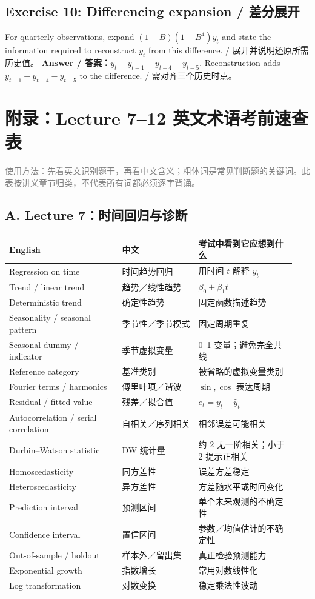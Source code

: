 \documentclass[UTF8,fontset=fandol,10.5pt,a4paper]{ctexart}
\begin{document}
\subsection*{Exercise 10: Differencing expansion / 差分展开}
For quarterly observations, expand $(1-B)(1-B^4)y_t$ and state the information required to reconstruct $y_t$ from this difference. / 展开并说明还原所需历史值。
\textbf{Answer / 答案：}$y_t-y_{t-1}-y_{t-4}+y_{t-5}$. Reconstruction adds $y_{t-1}+y_{t-4}-y_{t-5}$ to the difference. / 需对齐三个历史时点。
\clearpage
\section*{附录：Lecture 7--12 英文术语考前速查表}
\textcolor{graytext}{\small 使用方法：先看英文识别题干，再看中文含义；粗体词是常见判断题的关键词。此表按讲义章节归类，不代表所有词都必须逐字背诵。}

\subsection*{A. Lecture 7：时间回归与诊断}
\begin{longtable}{@{}p{0.37\linewidth}p{0.25\linewidth}p{0.32\linewidth}@{}}
\toprule English & 中文 & 考试中看到它应想到什么\\\midrule\endhead
Regression on time & 时间趋势回归 & 用时间 $t$ 解释 $y_t$\\
Trend / linear trend & 趋势／线性趋势 & $\beta_0+\beta_1t$\\
Deterministic trend & 确定性趋势 & 固定函数描述趋势\\
Seasonality / seasonal pattern & 季节性／季节模式 & 固定周期重复\\
Seasonal dummy / indicator & 季节虚拟变量 & 0--1 变量；避免完全共线\\
Reference category & 基准类别 & 被省略的虚拟变量类别\\
Fourier terms / harmonics & 傅里叶项／谐波 & $\sin,\cos$ 表达周期\\
Residual / fitted value & 残差／拟合值 & $e_t=y_t-\hat y_t$\\
Autocorrelation / serial correlation & 自相关／序列相关 & 相邻误差可能相关\\
Durbin--Watson statistic & DW 统计量 & 约 2 无一阶相关；小于 2 提示正相关\\
Homoscedasticity & 同方差性 & 误差方差稳定\\
Heteroscedasticity & 异方差性 & 方差随水平或时间变化\\
Prediction interval & 预测区间 & 单个未来观测的不确定性\\
Confidence interval & 置信区间 & 参数／均值估计的不确定性\\
Out-of-sample / holdout & 样本外／留出集 & 真正检验预测能力\\
Exponential growth & 指数增长 & 常用对数线性化\\
Log transformation & 对数变换 & 稳定乘法性波动\\
\bottomrule
\end{longtable}
\end{document}

